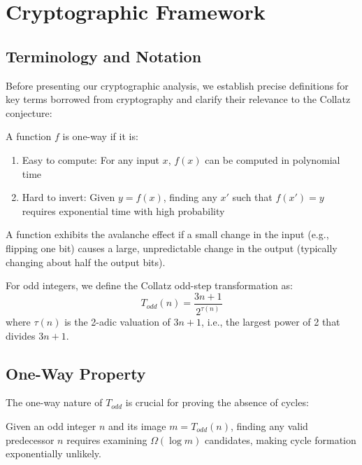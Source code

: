 \section{Cryptographic Framework}\label{sec:crypto_framework}

\subsection{Terminology and Notation}

Before presenting our cryptographic analysis, we establish precise definitions for key terms borrowed from cryptography and clarify their relevance to the Collatz conjecture:

\begin{definition}
A function $f$ is one-way if it is:
\begin{enumerate}
\item Easy to compute: For any input $x$, $f(x)$ can be computed in polynomial time
\item Hard to invert: Given $y = f(x)$, finding any $x'$ such that $f(x') = y$ requires exponential time with high probability
\end{enumerate}
\end{definition}

\begin{definition}
A function exhibits the avalanche effect if a small change in the input (e.g., flipping one bit) causes a large, unpredictable change in the output (typically changing about half the output bits).
\end{definition}

For odd integers, we define the Collatz odd-step transformation as:
\[
T_{odd}(n) = \frac{3n + 1}{2^{\tau(n)}}
\]
where $\tau(n)$ is the 2-adic valuation of $3n + 1$, i.e., the largest power of 2 that divides $3n + 1$.

\subsection{One-Way Property}

The one-way nature of $T_{odd}$ is crucial for proving the absence of cycles:

\begin{theorem}\label{thm:one_way}
Given an odd integer $n$ and its image $m = T_{odd}(n)$, finding any valid predecessor $n$ requires examining $\Omega(\log m)$ candidates, making cycle formation exponentially unlikely.
\end{theorem}

